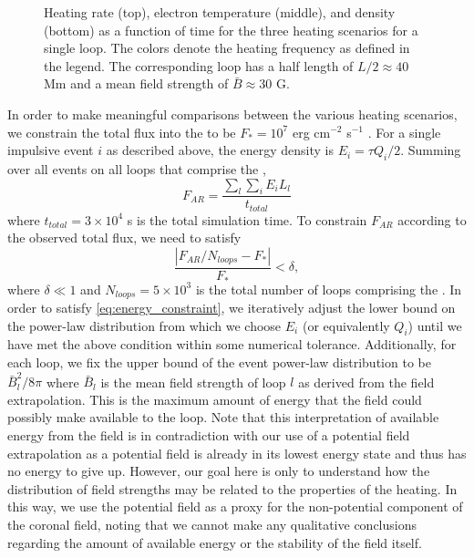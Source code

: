 \begin{figure}
    \caption{Heating rate (top), electron temperature (middle), and density (bottom) as a function of time for the three heating scenarios for a single loop. The colors denote the heating frequency as defined in the legend. The corresponding loop has a half length of $L/2\approx40$ Mm and a mean field strength of $\bar{B}\approx30$ G.}
    \label{fig:hydro}
\end{figure}

In order to make meaningful comparisons between the various heating scenarios, we constrain the total flux into the \AR{} to be $F_{\ast}=10^7$ erg cm$^{-2}$ s$^{-1}$ \citep{withbroe_mass_1977}. For a single impulsive event $i$ as described above, the energy density is $E_i=\tau Q_i/2$. Summing over all events on all loops that comprise the \AR{},
\begin{equation}
    F_{AR} = \frac{\sum_l\sum_i E_iL_l}{t_{total}}
\end{equation}
where $t_{total}=3\times10^4$ s is the total simulation time. To constrain $F_{AR}$ according to the observed total flux, we need to satisfy
\begin{equation}\label{eq:energy_constraint}
    \frac{| F_{AR}/N_{loops} - F_{\ast} |}{F_{\ast}} < \delta,
\end{equation}
where $\delta\ll1$ and $N_{loops}=5\times10^3$ is the total number of loops comprising the \AR{}. In order to satisfy \autoref{eq:energy_constraint}, we iteratively adjust the lower bound on the power-law distribution from which we choose $E_i$ (or equivalently $Q_i$) until we have met the above condition within some numerical tolerance. Additionally, for each loop, we fix the upper bound of the event power-law distribution to be $\bar{B}_l^2/8\pi$ where $\bar{B}_l$ is the mean field strength of loop $l$ as derived from the field extrapolation. This is the maximum amount of energy that the field could possibly make available to the loop. Note that this interpretation of available energy from the field is in contradiction with our use of a potential field extrapolation as a potential field is already in its lowest energy state and thus has no energy to give up. However, our goal here is only to understand how the distribution of field strengths may be related to the properties of the heating. In this way, we use the potential field as a proxy for the non-potential component of the coronal field, noting that we cannot make any qualitative conclusions regarding the amount of available energy or the stability of the field itself.

